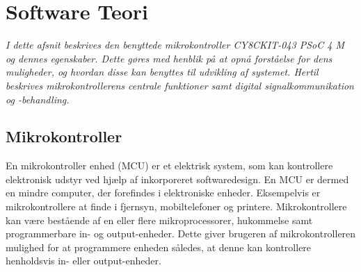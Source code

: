 \section{Software Teori}
\textit{I dette afsnit beskrives den benyttede mikrokontroller CY8CKIT-043 PSoC 4 M og dennes egenskaber. Dette gøres med henblik på at opnå forståelse for dens muligheder, og hvordan disse kan benyttes til udvikling af systemet. Hertil beskrives mikrokontrollerens centrale funktioner samt digital signalkommunikation og -behandling.}

\subsection{Mikrokontroller}
En mikrokontroller enhed (MCU) er et elektrisk system, som kan kontrollere elektronisk udstyr ved hjælp af inkorporeret softwaredesign. En MCU er dermed en mindre computer, der forefindes i elektroniske enheder. Eksempelvis er mikrokontrollere at finde i fjernsyn, mobiltelefoner og printere. \citep{Scienceuddannelse,Tanenbaum2006} \newline
Mikrokontrollere kan være bestående af en eller flere mikroprocessorer, hukommelse samt programmerbare in- og output-enheder. Dette giver brugeren af mikrokontrolleren mulighed for at programmere enheden således, at denne kan kontrollere henholdsvis in- eller output-enheder. \citep{Scienceuddannelse,Tanenbaum2006}


